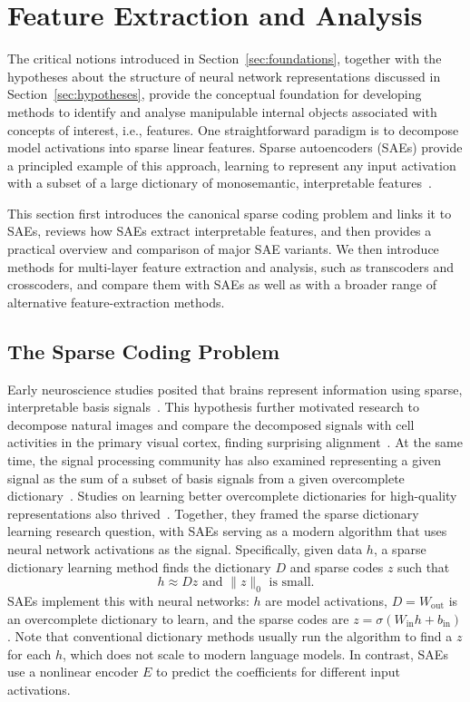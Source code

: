 \section{Feature Extraction and Analysis}
\label{sec:sae}

The critical notions introduced in Section~\ref{sec:foundations}, together with the hypotheses about the structure of neural network representations discussed in Section~\ref{sec:hypotheses}, provide the conceptual foundation for developing methods to identify and analyse manipulable internal objects associated with concepts of interest, i.e., features. One straightforward paradigm is to decompose model activations into sparse linear features. Sparse autoencoders (SAEs) provide a principled example of this approach, learning to represent any input activation with a subset of a large dictionary of monosemantic, interpretable features~.

This section first introduces the canonical sparse coding problem and links it to SAEs, reviews how SAEs extract interpretable features, and then provides a practical overview and comparison of major SAE variants. We then introduce methods for multi-layer feature extraction and analysis, such as transcoders and crosscoders, and compare them with SAEs as well as with a broader range of alternative feature-extraction methods.

\subsection{The Sparse Coding Problem}
Early neuroscience studies posited that brains represent information using sparse, interpretable basis signals~. This hypothesis further motivated research to decompose natural images and compare the decomposed signals with cell activities in the primary visual cortex, finding surprising alignment~. At the same time, the signal processing community has also examined representing a given signal as the sum of a subset of basis signals from a given overcomplete dictionary~. Studies on learning better overcomplete dictionaries for high-quality representations also thrived~. Together, they framed the sparse dictionary learning research question, with SAEs serving as a modern algorithm that uses neural network activations as the signal. Specifically, given data $h$, a sparse dictionary learning method finds the dictionary $D$ and sparse codes $z$ such that
\begin{equation}
h \approx Dz \text{ and } \|z\|_0 \text{ is small}.
\end{equation}
SAEs implement this with neural networks: $h$ are model activations, $D = W_{\text{out}}$ is an overcomplete dictionary to learn, and the sparse codes are $z = \sigma(W_{\text{in}} h + b_{\text{in}})$. Note that conventional dictionary methods usually run the algorithm to find a $z$ for each $h$, which does not scale to modern language models. In contrast, SAEs use a nonlinear encoder $E$ to predict the coefficients for different input activations.

